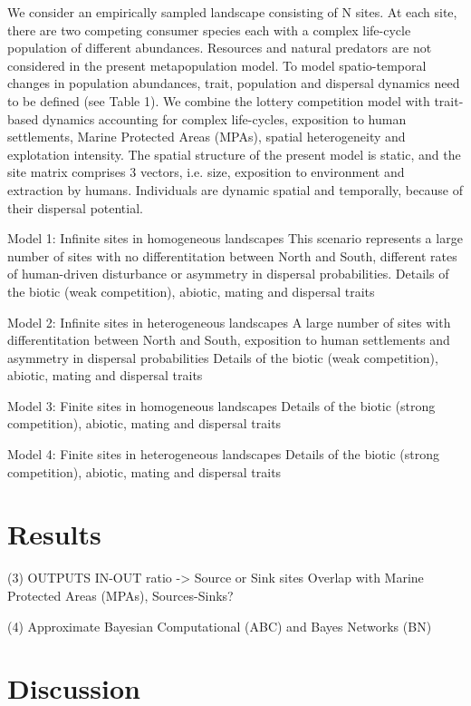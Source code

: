 \documentclass[12pt]{article}
\begin{document}
\begin{flushleft}
{{{{{We consider an empirically sampled landscape consisting of N sites. At each site, there are two competing consumer species each with a complex life-cycle population of different abundances. Resources and natural predators are not considered in the present metapopulation model. To model spatio-temporal changes in population abundances, trait, population and dispersal dynamics need to be defined (see Table 1). We combine the lottery competition model \citep{chesson1981environmental} with trait-based dynamics accounting for complex life-cycles, exposition to human settlements, Marine Protected Areas (MPAs), spatial heterogeneity and explotation intensity. The spatial structure of the present model is static, and the site matrix comprises 3 vectors, i.e. size, exposition to environment and extraction by humans. Individuals are dynamic spatial and temporally, because of their dispersal potential.

Model 1: Infinite sites in homogeneous landscapes
This scenario represents a large number of sites with no differentitation between North and South, different rates of human-driven disturbance or asymmetry in dispersal probabilities. Details of the biotic (weak competition), abiotic, mating and dispersal traits

Model 2: Infinite sites in heterogeneous landscapes 
A large number of sites with differentitation between North and South, exposition to human settlements and asymmetry in dispersal probabilities
Details of the biotic (weak competition), abiotic, mating and dispersal traits

Model 3: Finite sites in homogeneous landscapes 
Details of the biotic (strong competition), abiotic, mating and dispersal traits

Model 4: Finite sites in heterogeneous landscapes 
Details of the biotic (strong competition), abiotic, mating and dispersal traits

\section{Results}

(3) OUTPUTS
IN-OUT ratio -> Source or Sink sites
Overlap with Marine Protected Areas (MPAs), Sources-Sinks?

(4) Approximate Bayesian Computational (ABC) and Bayes Networks (BN)

\section{Discussion}

}}}}}
\end{flushleft}
\end{document}
